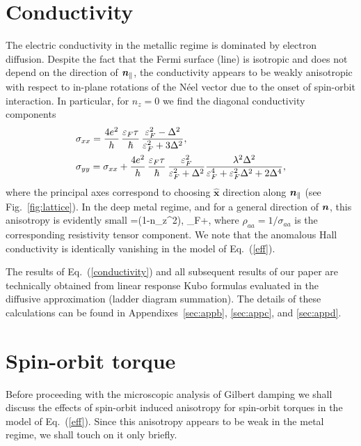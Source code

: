 \section{Conductivity}\label{sec:cond}
The electric conductivity in the metallic regime is dominated by electron diffusion. Despite the fact that the Fermi surface (line) is isotropic and does not depend on the direction of $\boldsymbol{n}_\parallel$, the conductivity appears to be weakly anisotropic with respect to in-plane rotations of the N\'eel vector due to the onset of spin-orbit interaction. 
In particular, for $n_z=0$ we find the diagonal conductivity components
\beml
\label{conductivity}
\begin{align}
\label{eq:long_cond}
&\sigma_{xx}= \frac{4e^2}{h}\,\frac{\varepsilon_F \tau}{\hbar}\,\frac{\varepsilon_F^2-\Delta^2}{\varepsilon_F^2+3\Delta^2},\\
&\sigma_{yy}= \sigma_{xx}+\frac{4e^2}{h}\,\frac{\varepsilon_F \tau}{\hbar}\, \frac{\varepsilon_F^2}{\varepsilon_F^2+\Delta^2}
\frac{\lambda^2\Delta^2}{\varepsilon_F^4+\varepsilon_F^2\Delta^2+2\Delta^4},
\end{align}
\eml
where the principal axes correspond to choosing $\hat{\bm{x}}$ direction along $\boldsymbol{n}_\parallel$ (see Fig.~\ref{fig:lattice}). In the deep metal regime, and for a general direction of $\boldsymbol{n}$, this anisotropy is evidently small
\be
\label{ani}
=(1-n_z^2), \quad \ep_F\gg \lambda+\Delta,
\e
where $\rho_{aa}=1/\sigma_{aa}$ is the corresponding resistivity tensor component. We note that the anomalous Hall conductivity is identically vanishing in the model of Eq.~(\ref{eff}). 

The results of Eq.~(\ref{conductivity}) and all subsequent results of our paper are technically obtained from linear response Kubo formulas evaluated in the diffusive approximation (ladder diagram summation). The details of these calculations can be found in Appendixes~\ref{sec:appb}, \ref{sec:appc}, and \ref{sec:appd}. 

\section{Spin-orbit torque}\label{sec:sot}

Before proceeding with the microscopic analysis of Gilbert damping we shall discuss the effects of spin-orbit induced anisotropy for spin-orbit torques in the model of Eq.~(\ref{eff}). Since this anisotropy appears to be weak in the metal regime, we shall touch on it only briefly. 


